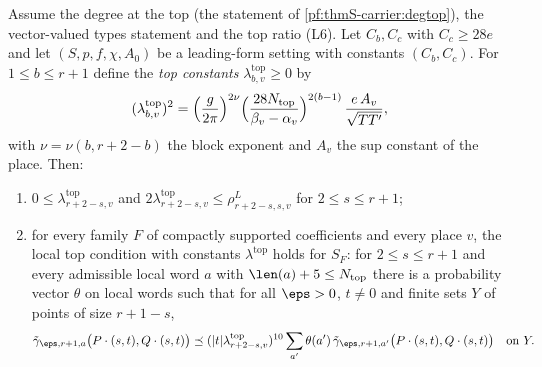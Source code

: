 \begin{theorem}\label{pf:thmS-carrier:toploc}
Assume the degree at the top (the statement of \cref{pf:thmS-carrier:degtop}), the vector-valued types statement and the
top ratio (L6). Let $C_b,C_c$ with $C_c\ge28e$ and let $(S,p,f,\chi,A_0)$ be a leading-form setting with constants
$(C_b,C_c)$. For $1\le b\le r+1$ define the \emph{top constants} $\lambda^{\mathrm{top}}_{b,v}\ge0$ by
\[
(\lambda^{\mathrm{top}}_{b,v})^2=\Bigl(\frac g{2\pi}\Bigr)^{2\nu}\Bigl(\frac{28N_{\mathrm{top}}}{\beta_v-\alpha_v}
\Bigr)^{2(b-1)}\,\frac{e\,A_v}{\sqrt{TT'}},
\]
with $\nu=\nu(b,r+2-b)$ the block exponent and $A_v$ the sup constant of the place. Then:
\begin{enumerate}[label=(\roman*)]
\item $0\le\lambda^{\mathrm{top}}_{r+2-s,v}$ and $2\lambda^{\mathrm{top}}_{r+2-s,v}\le\rho^L_{r+2-s,s,v}$ for $2\le s\le r+1$;
\item for every family $F$ of compactly supported coefficients and every place $v$, the local top condition with constants
  $\lambda^{\mathrm{top}}$ holds for $S_F$: for $2\le s\le r+1$ and every admissible local word $a$ with
  $\len(a)+5\le\thmScarrierNtop$ there is a probability vector $\theta$ on local words such that for all $\eps>0$, $t\ne0$ and
  finite sets $Y$ of points of size $r+1-s$,
  \[
  \tilde\gamma_{\eps,r+1,a}\bigl(P\cdot(s,t),Q\cdot(s,t)\bigr)\preceq(|t|\lambda^{\mathrm{top}}_{r+2-s,v})^{10}\sum_{a'}
  \theta(a')\,\tilde\gamma_{\eps,r+1,a'}\bigl(P\cdot(s,t),Q\cdot(s,t)\bigr)\quad\text{on }Y.
  \]
\end{enumerate}
\end{theorem}

